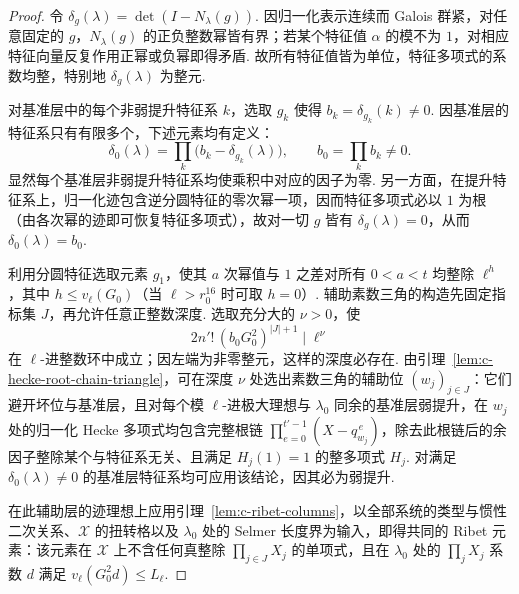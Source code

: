 \begin{proof}
令 $\delta_g(\lambda)=\det(I-N_\lambda(g))$. 因归一化表示连续而 Galois 群紧，对任意固定的 $g$，$N_\lambda(g)$ 的正负整数幂皆有界；若某个特征值 $\alpha$ 的模不为 $1$，对相应特征向量反复作用正幂或负幂即得矛盾. 故所有特征值皆为单位，特征多项式的系数均整，特别地 $\delta_g(\lambda)$ 为整元.

对基准层中的每个非弱提升特征系 $k$，选取 $g_k$ 使得 $b_k=\delta_{g_k}(k)\ne0$. 因基准层的特征系只有有限多个，下述元素均有定义：
\[
 \delta_0(\lambda)=\prod_k \bigl(b_k-\delta_{g_k}(\lambda)\bigr),
 \qquad b_0=\prod_k b_k\ne0 .
\]
显然每个基准层非弱提升特征系均使乘积中对应的因子为零. 另一方面，在提升特征系上，归一化迹包含逆分圆特征的零次幂一项，因而特征多项式必以 $1$ 为根（由各次幂的迹即可恢复特征多项式），故对一切 $g$ 皆有 $\delta_g(\lambda)=0$，从而 $\delta_0(\lambda)=b_0$.

利用分圆特征选取元素 $g_1$，使其 $a$ 次幂值与 $1$ 之差对所有 $0<a<t$ 均整除 $\ell^h$，其中 $h\le v_\ell(G_0)$（当 $\ell>r_0^{16}$ 时可取 $h=0$）. 辅助素数三角的构造先固定指标集 $J$，再允许任意正整数深度. 选取充分大的 $\nu>0$，使
\[
 2n'!\,(b_0G_0^2)^{|J|+1}\mid \ell^\nu
\]
在 $\ell$-进整数环中成立；因左端为非零整元，这样的深度必存在. 由引理~\ref{lem:c-hecke-root-chain-triangle}，可在深度 $\nu$ 处选出素数三角的辅助位 $(w_j)_{j\in J}$：它们避开坏位与基准层，且对每个模 $\ell$-进极大理想与 $\lambda_0$ 同余的基准层弱提升，在 $w_j$ 处的归一化 Hecke 多项式均包含完整根链 $\prod_{e=0}^{t'-1}(X-q_{w_j}^{\,e})$，除去此根链后的余因子整除某个与特征系无关、且满足 $H_j(1)=1$ 的整多项式 $H_j$. 对满足 $\delta_0(\lambda)\ne0$ 的基准层特征系均可应用该结论，因其必为弱提升.

在此辅助层的迹理想上应用引理~\ref{lem:c-ribet-columns}，以全部系统的类型与惯性二次关系、$\mathcal X$ 的扭转格以及 $\lambda_0$ 处的 Selmer 长度界为输入，即得共同的 Ribet 元素：该元素在 $\mathcal X$ 上不含任何真整除 $\prod_{j\in J}X_j$ 的单项式，且在 $\lambda_0$ 处的 $\prod_j X_j$ 系数 $d$ 满足 $v_\ell(G_0^2d)\le L_\ell$.


\end{proof}
